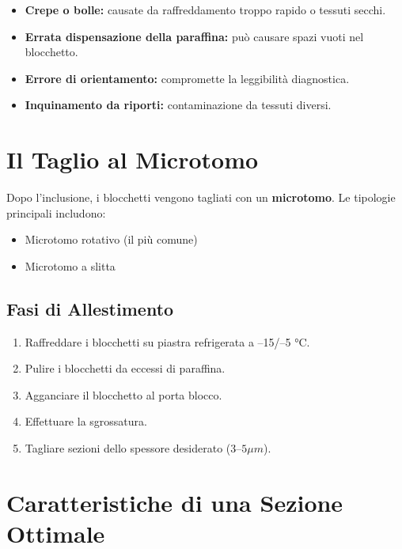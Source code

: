 \begin{itemize}
    \item \textbf{Crepe o bolle:} causate da raffreddamento troppo rapido o tessuti secchi.
    \item \textbf{Errata dispensazione della paraffina:} può causare spazi vuoti nel blocchetto.
    \item \textbf{Errore di orientamento:} compromette la leggibilità diagnostica.
    \item \textbf{Inquinamento da riporti:} contaminazione da tessuti diversi.
\end{itemize}

\section{Il Taglio al Microtomo}

Dopo l'inclusione, i blocchetti vengono tagliati con un \textbf{microtomo}. Le tipologie principali includono:

\begin{itemize}
    \item Microtomo rotativo (il più comune)
    \item Microtomo a slitta
\end{itemize}

\subsection{Fasi di Allestimento}

\begin{enumerate}
    \item Raffreddare i blocchetti su piastra refrigerata a –15/–5 °C.
    \item Pulire i blocchetti da eccessi di paraffina.
    \item Agganciare il blocchetto al porta blocco.
    \item Effettuare la sgrossatura.
    \item Tagliare sezioni dello spessore desiderato ($3–5\mu m$).
\end{enumerate}


\section{Caratteristiche di una Sezione Ottimale}

